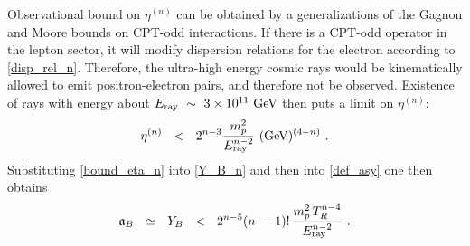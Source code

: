 \documentclass[12pt]{revtex4}
\newcommand{\Eray}{E_{\rm ray}}
\newcommand{\GeV}{{\rm GeV}}
\begin{document}
	Observational bound on $ \eta^{(n)} $ can be obtained by a generalizations
	of the Gagnon and Moore bounds 
\cite{Gagnon:2004xh} 
	on CPT-odd interactions.
	If there is a CPT-odd operator in the lepton sector, it will modify dispersion
	relations for the electron according to \eqref{disp_rel_n}.
	Therefore, the ultra-high energy cosmic rays would be kinematically allowed to 
	emit positron-electron pairs, and therefore not be observed.
	Existence of rays with energy about $ \Eray ~\sim~ 3\times10^{11}~\GeV $ then 
	puts a limit on $ \eta^{(n)} $:
\begin{equation}
\label{bound_eta_n}
	\eta^{(n)} ~~<~~ 
	2^{n-3} \frac{m_p^2}{\Eray^{n-2}}~(\GeV)^{(4-n)}~.
\end{equation}
%
	Substituting \eqref{bound_eta_n} into \eqref{Y_B_n} and then into 
	\eqref{def_asy} one then obtains
\begin{align}
\notag
	\mathfrak{a}_B ~~\simeq~~ Y_B
	~~<~~ 
		2^{n-5} (n\,-\,1)!\, \frac{m_p^2\, T_R^{n-4}}{\Eray^{n-2}}~.
\end{align}
\end{document}
